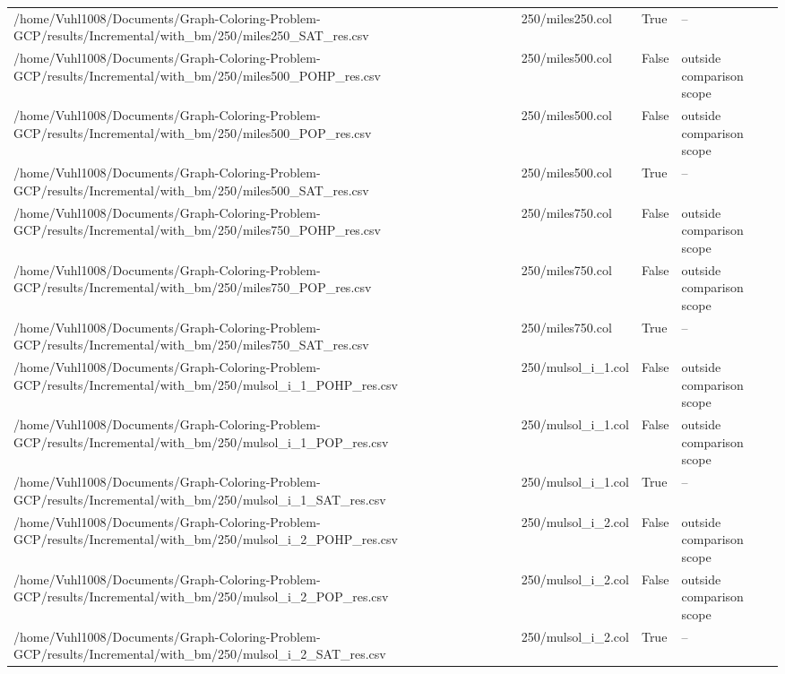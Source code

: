 \begin{table}[htbp]
\begin{tabular}{llll}
/home/Vuhl1008/Documents/Graph-Coloring-Problem-GCP/results/Incremental/with\_bm/250/miles250\_SAT\_res.csv & 250/miles250.col & True & -- \\
/home/Vuhl1008/Documents/Graph-Coloring-Problem-GCP/results/Incremental/with\_bm/250/miles500\_POHP\_res.csv & 250/miles500.col & False & outside comparison scope \\
/home/Vuhl1008/Documents/Graph-Coloring-Problem-GCP/results/Incremental/with\_bm/250/miles500\_POP\_res.csv & 250/miles500.col & False & outside comparison scope \\
/home/Vuhl1008/Documents/Graph-Coloring-Problem-GCP/results/Incremental/with\_bm/250/miles500\_SAT\_res.csv & 250/miles500.col & True & -- \\
/home/Vuhl1008/Documents/Graph-Coloring-Problem-GCP/results/Incremental/with\_bm/250/miles750\_POHP\_res.csv & 250/miles750.col & False & outside comparison scope \\
/home/Vuhl1008/Documents/Graph-Coloring-Problem-GCP/results/Incremental/with\_bm/250/miles750\_POP\_res.csv & 250/miles750.col & False & outside comparison scope \\
/home/Vuhl1008/Documents/Graph-Coloring-Problem-GCP/results/Incremental/with\_bm/250/miles750\_SAT\_res.csv & 250/miles750.col & True & -- \\
/home/Vuhl1008/Documents/Graph-Coloring-Problem-GCP/results/Incremental/with\_bm/250/mulsol\_i\_1\_POHP\_res.csv & 250/mulsol\_i\_1.col & False & outside comparison scope \\
/home/Vuhl1008/Documents/Graph-Coloring-Problem-GCP/results/Incremental/with\_bm/250/mulsol\_i\_1\_POP\_res.csv & 250/mulsol\_i\_1.col & False & outside comparison scope \\
/home/Vuhl1008/Documents/Graph-Coloring-Problem-GCP/results/Incremental/with\_bm/250/mulsol\_i\_1\_SAT\_res.csv & 250/mulsol\_i\_1.col & True & -- \\
/home/Vuhl1008/Documents/Graph-Coloring-Problem-GCP/results/Incremental/with\_bm/250/mulsol\_i\_2\_POHP\_res.csv & 250/mulsol\_i\_2.col & False & outside comparison scope \\
/home/Vuhl1008/Documents/Graph-Coloring-Problem-GCP/results/Incremental/with\_bm/250/mulsol\_i\_2\_POP\_res.csv & 250/mulsol\_i\_2.col & False & outside comparison scope \\
/home/Vuhl1008/Documents/Graph-Coloring-Problem-GCP/results/Incremental/with\_bm/250/mulsol\_i\_2\_SAT\_res.csv & 250/mulsol\_i\_2.col & True & -- \\

\end{tabular}
\end{table}
